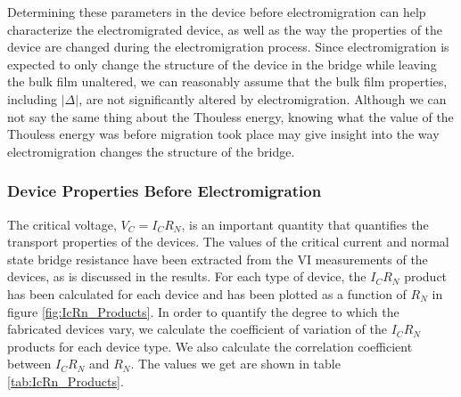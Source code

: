 Determining these parameters in the device before electromigration can help characterize the electromigrated device, as well as the way the properties of the device are changed during the electromigration process. Since electromigration is expected to only change the structure of the device in the bridge while leaving the bulk film unaltered, we can reasonably assume that the bulk film properties, including $|\Delta|$, are not significantly altered by electromigration. Although we can not say the same thing about the Thouless energy, knowing what the value of the Thouless energy was before migration took place may give insight into the way electromigration changes the structure of the bridge.








\subsubsection*{Device Properties Before Electromigration}

The critical voltage, $V_C = I_CR_N$, is an important quantity that quantifies the transport properties of the devices. The values of the critical current and normal state bridge resistance have been extracted from the VI measurements of the devices, as is discussed in the results. For each type of device, the $I_CR_N$ product has been calculated for each device and has been plotted as a function of $R_N$ in figure \ref{fig:IcRn_Products}. In order to quantify the degree to which the fabricated devices vary, we calculate the coefficient of variation of the $I_CR_N$ products for each device type. We also calculate the correlation coefficient between $I_CR_N$ and $R_N$. The values we get are shown in table \ref{tab:IcRn_Products}.

